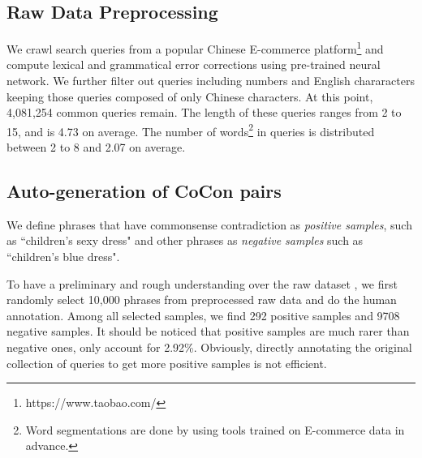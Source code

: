 \subsection{Raw Data Preprocessing}

We crawl search queries from a popular Chinese E-commerce platform\footnote{https://www.taobao.com/} and compute lexical and grammatical error corrections using pre-trained neural network. 
We further filter out queries including numbers and English chararacters keeping
those queries composed of only Chinese characters. 
At this point, 4,081,254 common queries remain. 
The length of these queries ranges from 2 to 15, and is 4.73 on average. 
The number of words\footnote{Word segmentations are done by using tools trained 
on E-commerce data in advance.} in queries is distributed between 2 to 8 and 2.07 
on average. 



\subsection{Auto-generation of CoCon pairs}
We define phrases that have commonsense contradiction as \textit{positive samples}, such as ``children's sexy dress" and other phrases as \textit{negative samples} such as ``children's blue dress". 

To have a preliminary and rough understanding over the raw dataset
, we first randomly select 10,000 phrases from preprocessed raw data and do the human annotation. 
Among all selected samples, we find 292 positive samples and 9708 negative samples. It should be noticed that positive samples are much rarer than negative ones, only account for 2.92\%. Obviously, directly annotating the original collection of queries to get more positive samples is not efficient.


